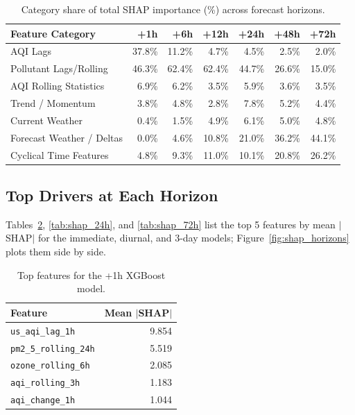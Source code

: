 \documentclass[12pt, a4paper]{article}
\begin{document}
\begin{table}[H]
\centering
\caption{Category share of total SHAP importance (\%) across forecast horizons.}
\label{tab:shap_categories}
\small
\begin{tabular}{lrrrrrr}
\toprule
\textbf{Feature Category} & \textbf{+1h} & \textbf{+6h} & \textbf{+12h} & \textbf{+24h} & \textbf{+48h} & \textbf{+72h} \\
\midrule
AQI Lags                  & 37.8\% & 11.2\% &  4.7\% &  4.5\% &  2.5\% &  2.0\% \\
Pollutant Lags/Rolling    & 46.3\% & 62.4\% & 62.4\% & 44.7\% & 26.6\% & 15.0\% \\
AQI Rolling Statistics    &  6.9\% &  6.2\% &  3.5\% &  5.9\% &  3.6\% &  3.5\% \\
Trend / Momentum          &  3.8\% &  4.8\% &  2.8\% &  7.8\% &  5.2\% &  4.4\% \\
Current Weather           &  0.4\% &  1.5\% &  4.9\% &  6.1\% &  5.0\% &  4.8\% \\
Forecast Weather / Deltas &  0.0\% &  4.6\% & 10.8\% & 21.0\% & 36.2\% & 44.1\% \\
Cyclical Time Features    &  4.8\% &  9.3\% & 11.0\% & 10.1\% & 20.8\% & 26.2\% \\
\bottomrule
\end{tabular}
\end{table}

\subsection{Top Drivers at Each Horizon}
Tables~\ref{tab:shap_1h}, \ref{tab:shap_24h}, and \ref{tab:shap_72h} list the top 5 features by mean $|$SHAP$|$ for the immediate, diurnal, and 3-day models; Figure~\ref{fig:shap_horizons} plots them side by side.

\begin{table}[H]
\centering
\caption{Top features for the +1h XGBoost model.}
\label{tab:shap_1h}
\small
\begin{tabular}{lr}
\toprule
\textbf{Feature} & \textbf{Mean $|$SHAP$|$} \\
\midrule
\texttt{us\_aqi\_lag\_1h}       & 9.854 \\
\texttt{pm2\_5\_rolling\_24h}   & 5.519 \\
\texttt{ozone\_rolling\_6h}     & 2.085 \\
\texttt{aqi\_rolling\_3h}       & 1.183 \\
\texttt{aqi\_change\_1h}        & 1.044 \\
\bottomrule
\end{tabular}
\end{table}
\end{document}
